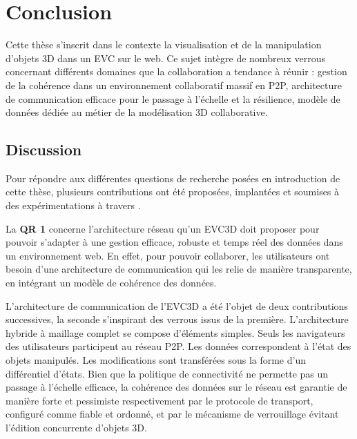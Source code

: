 \chapter{Conclusion}
\chaptertable

Cette thèse s'inscrit dans le contexte la visualisation et de la manipulation d'objets 
3D dans un \gls{EVC} sur le web. Ce sujet intègre de nombreux verrous 
concernant différents domaines que la collaboration a tendance à réunir : gestion 
de la cohérence dans un environnement collaboratif massif en \gls{P2P}, 
architecture de communication efficace pour le passage à l'échelle et la résilience, 
modèle de données dédiée au métier de la modélisation 3D collaborative. 

\section{Discussion}
Pour répondre aux différentes questions de 
recherche posées en introduction de cette thèse, plusieurs contributions ont été 
proposées, implantées et soumises à des expérimentations à travers 
\cite{Desprat2015a,Desprat2015b,Desprat2016,Desprat2017}. 


La \textbf{QR 1} concerne l'architecture réseau qu'un \gls{EVC3D} doit proposer 
pour 
pouvoir s'adapter à une gestion efficace, robuste et temps réel des données dans 
un environnement web. En effet, pour pouvoir collaborer, les utilisateurs ont besoin 
d'une architecture de communication qui les relie de manière transparente, en 
intégrant un modèle de cohérence des données. 

L'architecture de communication de l'\gls{EVC3D} a été l'objet de deux 
contributions successives, la seconde s'inspirant des verrous issus de la 
première. 
L'architecture hybride à maillage complet se compose d'éléments 
simples. 
Seuls 
les navigateurs des utilisateurs participent au réseau \gls{P2P}. Les données 
correspondent à l'état des objets manipulés. Les modifications sont transférées 
sous la forme d'un différentiel d'états. Bien que la politique de connectivité ne 
permette pas un passage à l'échelle efficace, la cohérence des données sur le 
réseau est garantie de manière forte et pessimiste respectivement par le protocole 
de transport, configuré comme fiable et ordonné, et par le mécanisme de 
verrouillage évitant l'édition concurrente d'objets 3D.

